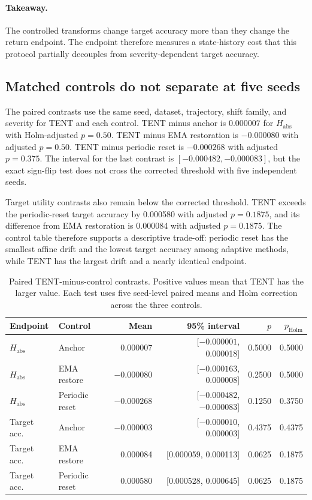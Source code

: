 \documentclass[11pt]{article}
\newcommand{\Habs}{\ensuremath{H_{\mathrm{abs}}}}
\begin{document}
\paragraph{Takeaway.}
The controlled transforms change target accuracy more than they change the return endpoint. The endpoint therefore measures a state-history cost that this protocol partially decouples from severity-dependent target accuracy.

\subsection{Matched controls do not separate at five seeds}
\label{sec:contrasts}

The paired contrasts use the same seed, dataset, trajectory, shift family, and severity for TENT and each control. TENT minus anchor is $0.000007$ for $\Habs$ with Holm-adjusted $p=0.50$. TENT minus EMA restoration is $-0.000080$ with adjusted $p=0.50$. TENT minus periodic reset is $-0.000268$ with adjusted $p=0.375$. The interval for the last contrast is $[-0.000482,-0.000083]$, but the exact sign-flip test does not cross the corrected threshold with five independent seeds.

Target utility contrasts also remain below the corrected threshold. TENT exceeds the periodic-reset target accuracy by 0.000580 with adjusted $p=0.1875$, and its difference from EMA restoration is 0.000084 with adjusted $p=0.1875$. The control table therefore supports a descriptive trade-off: periodic reset has the smallest affine drift and the lowest target accuracy among adaptive methods, while TENT has the largest drift and a nearly identical endpoint.

\begin{table}[t]
\centering
\scriptsize
\caption{Paired TENT-minus-control contrasts. Positive values mean that TENT has the larger value. Each test uses five seed-level paired means and Holm correction across the three controls.}
\label{tab:contrasts}
\begin{tabular}{llrrrr}
\toprule
Endpoint & Control & Mean & 95\% interval & $p$ & $p_{\mathrm{Holm}}$ \\
\midrule
$\Habs$ & Anchor & 0.000007 & [$-0.000001$, 0.000018] & 0.5000 & 0.5000 \\
$\Habs$ & EMA restore & $-0.000080$ & [$-0.000163$, 0.000008] & 0.2500 & 0.5000 \\
$\Habs$ & Periodic reset & $-0.000268$ & [$-0.000482$, $-0.000083$] & 0.1250 & 0.3750 \\
Target acc. & Anchor & $-0.000003$ & [$-0.000010$, 0.000003] & 0.4375 & 0.4375 \\
Target acc. & EMA restore & 0.000084 & [0.000059, 0.000113] & 0.0625 & 0.1875 \\
Target acc. & Periodic reset & 0.000580 & [0.000528, 0.000645] & 0.0625 & 0.1875 \\
\bottomrule
\end{tabular}
\end{table}
\end{document}
